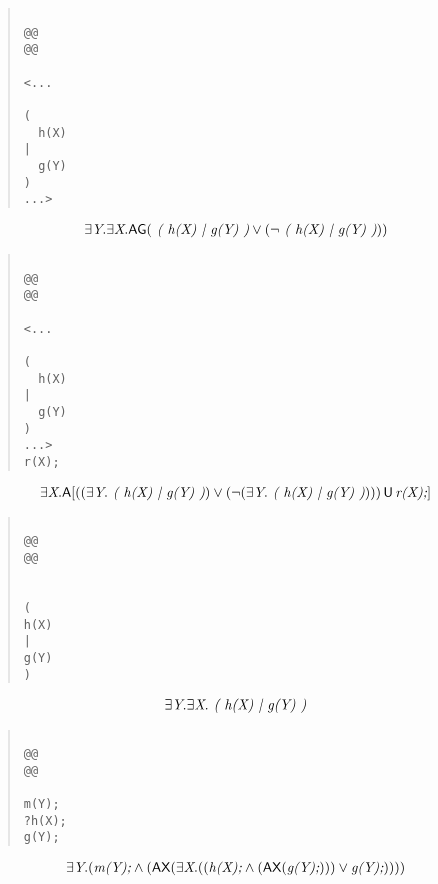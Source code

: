 \documentclass{article}
\newcommand{\U}{\,\mbox{\sf{U}}\,}
\newcommand{\A}{\mbox{\sf{A}}}
\newcommand{\AX}{\mbox{\sf{AX}}}
\newcommand{\AG}{\mbox{\sf{AG}}}
\newcommand{\mita}[1]{\mbox{\it{{#1}}}}
\begin{document}
\begin{quote}\begin{verbatim}

@@
@@

<...
  
(
  h(X)
|
  g(Y)
)
...>
\end{verbatim}\end{quote}

\[\begin{array}{l}
\exists \mita{Y} . \exists \mita{X} . \AG(\mita{
(
h(X)
|
g(Y)
)} \vee (\neg \mita{
(
h(X)
|
g(Y)
)}))
\end{array}\]

\begin{quote}\begin{verbatim}

@@
@@

<...
  
(
  h(X)
|
  g(Y)
)
...>
r(X);
\end{verbatim}\end{quote}

\[\begin{array}{l}
\exists \mita{X} . \A[((\exists \mita{Y} . \mita{
(
h(X)
|
g(Y)
)}) \vee (\neg (\exists \mita{Y} . \mita{
(
h(X)
|
g(Y)
)}))) \U \mita{r(X);}]

\end{array}\]

\begin{quote}\begin{verbatim}

@@
@@


(
h(X)
|
g(Y)
)
\end{verbatim}\end{quote}

\[\begin{array}{l}
\exists \mita{Y} . \exists \mita{X} . \mita{
(
h(X)
|
g(Y)
)}
\end{array}\]

\begin{quote}\begin{verbatim}

@@
@@

m(Y);
?h(X);
g(Y);
\end{verbatim}\end{quote}

\[\begin{array}{l}
\exists \mita{Y} . (\mita{m(Y);} \wedge (\AX(\exists \mita{X} . ((\mita{h(X);} \wedge (\AX(\mita{g(Y);}))) \vee \mita{g(Y);}))))
\end{array}\]
\end{document}
